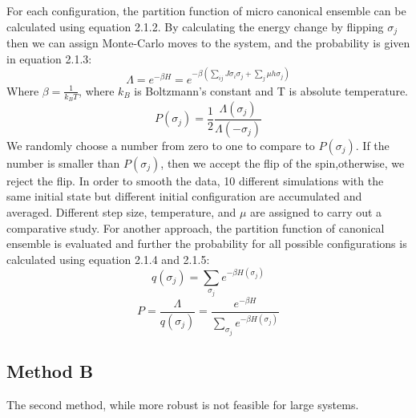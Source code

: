 \documentclass{llncs}
\begin{document}
For each configuration, the partition function of micro canonical ensemble can be calculated using equation 2.1.2. By calculating the energy change by flipping $\sigma_j$ then we can assign Monte-Carlo moves to the system, and the probability is given in equation 2.1.3:
\begin{equation} 
\Lambda=e^{-\beta H} = e^{-\beta (\sum_{ij}  J\sigma_i\sigma_j+\sum_j\mu h\sigma_j) }
\end{equation}
Where $\beta=\frac{1}{k_BT}$, where $k_B$ is Boltzmann's constant and T is absolute temperature.
\begin{equation} 
P(\sigma_j)=\frac{1}{2} \frac{\Lambda(\sigma_j)}{\Lambda(-\sigma_j)}
\end{equation}
We randomly choose a number from zero to one to compare to $P(\sigma_j)$. If the number is smaller than $P(\sigma_j)$, then we accept the flip of the spin,otherwise, we reject the flip. In order to smooth the data, 10 different simulations with the same initial state but different initial configuration are accumulated and averaged. Different step size, temperature, and $\mu$ are assigned to carry out a comparative study.
For another approach,  the partition function of canonical ensemble is evaluated and further the probability for all possible configurations is calculated using equation 2.1.4 and 2.1.5:
\begin{equation} 
q(\sigma_j)=\sum_{\sigma_j} e^{-\beta H(\sigma_j)}
\end{equation}
\begin{equation} 
P=\frac{\Lambda}{q(\sigma_j)}=\frac{e^{-\beta H}}{\sum_{\sigma_j} e^{-\beta H(\sigma_j)}}
\end{equation}

\subsection{Method B}
The second method, while more robust is not feasible for large systems. 
\end{document}
